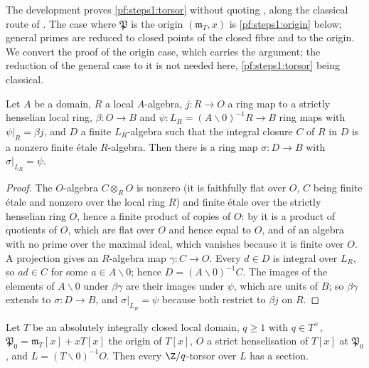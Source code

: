 \begin{remark}\label{pf:steps1:torsorrem}
The development proves \cref{pf:steps1:torsor} without quoting \cite{ArtinGrothendieckVerdier1972}, along the classical
route of \cite[Exp.~XV, \S\S2--3]{ArtinGrothendieckVerdier1972}. The case where $\mathfrak P$ is the origin
$(\mathfrak m_T,x)$ is \cref{pf:steps1:origin} below; general primes are reduced to closed points of the closed fibre and
to the origin. We convert the proof of the origin case, which carries the argument; the reduction of the general case to
it is not needed here, \cref{pf:steps1:torsor} being classical.
\end{remark}

\begin{lemma}\label{pf:steps1:ptsh}
Let $A$ be a domain, $R$ a local $A$-algebra, $j\colon R\to O$ a ring map to a strictly henselian local ring, $\beta\colon
O\to B$ and $\psi\colon L_R=(A\smallsetminus0)^{-1}R\to B$ ring maps with $\psi|_R=\beta j$, and $D$ a finite $L_R$-algebra
such that the integral closure $C$ of $R$ in $D$ is a nonzero finite \'etale $R$-algebra. Then there is a ring map
$\sigma\colon D\to B$ with $\sigma|_{L_R}=\psi$.
\end{lemma}

\begin{proof}
The $O$-algebra $C\otimes_RO$ is nonzero (it is faithfully flat over $O$, $C$ being finite \'etale and nonzero over the
local ring $R$) and finite \'etale over the strictly henselian ring $O$, hence a finite product of copies of $O$: by
\cite[Tag~04GL]{Stacks2024} it is a product of quotients of $O$, which are flat over $O$ and hence equal to $O$, and of an
algebra with no prime over the maximal ideal, which vanishes because it is finite over $O$. A projection gives an
$R$-algebra map $\gamma\colon C\to O$. Every $d\in D$ is integral over
$L_R$, so $ad\in C$ for some $a\in A\smallsetminus0$; hence $D=(A\smallsetminus0)^{-1}C$. The images of the elements of
$A\smallsetminus0$ under $\beta\gamma$ are their images under $\psi$, which are units of $B$; so $\beta\gamma$ extends to
$\sigma\colon D\to B$, and $\sigma|_{L_R}=\psi$ because both restrict to $\beta j$ on $R$.
\end{proof}

\begin{lemma}\label{pf:steps1:origin}
Let $T$ be an absolutely integrally closed local domain, $q\ge1$ with $q\in T^\times$, $\mathfrak P_0=\mathfrak m_T[x]+xT[x]$ the
origin of $T[x]$, $O$ a strict henselisation of $T[x]$ at $\mathfrak P_0$, and $L=(T\smallsetminus0)^{-1}O$. Then every
$\Z/q$-torsor over $L$ has a section.
\end{lemma}

